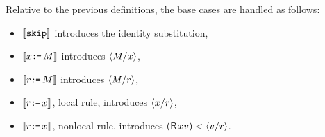 Relative to the previous definitions, the base cases are handled as follows:
\begin{itemize}
\item $\llbracket\texttt{skip}\rrbracket$ introduces the identity substitution,
\item $\llbracket x\texttt{:}\mkern-1mu\texttt{=}\,M\rrbracket$ introduces $\langle M/x\rangle$,
\item $\llbracket r\texttt{:}\mkern-1mu\texttt{=}\,M\rrbracket$ introduces $\langle M/r\rangle$,
\item $\llbracket r\texttt{:}\mkern-1mu\texttt{=}\,x\rrbracket$, local rule, introduces $\langle x/r\rangle$,
\item $\llbracket r\texttt{:}\mkern-1mu\texttt{=}\,x\rrbracket$, nonlocal rule, introduces
  $(\DR{\aLoc}{\aVal}) \lt \SUB{\aVal/\aReg}$.
\end{itemize}




